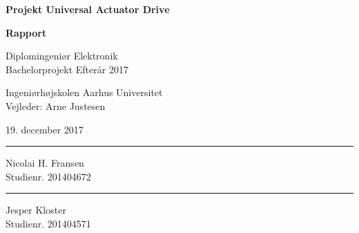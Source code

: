 \documentclass[11pt, a4paper, twoside, openany]{memoir}
\date{}
\author{\forfatter}
\title{\titel}
\begin{document}
\begin{titlingpage}
		
		\begin{center}
				{\huge\bfseries Projekt Universal Actuator Drive}\\
				\vspace{10pt}
				
				{\Huge\bfseries Rapport}\\
				
				\vspace{20pt}
				
				{Diplomingeniør Elektronik}\\
				{\large Bachelorprojekt Efterår 2017}\\
				
				\vspace{10pt}
				
				Ingeniørhøjskolen Aarhus Universitet\\
				Vejleder: Arne Justesen
				\vspace{10pt}
				
				19. december 2017
				\vspace{10pt}
				\begin{figure}[H]
					\centering
				\end{figure}
				\vspace{50pt}
				\begin{minipage}{0.25\linewidth}
					\centering
					\hrule
					\vspace{12pt}
					Nicolai H. Fransen\\
					Studienr. 201404672
				\end{minipage}
				\hspace{10pt}
				\begin{minipage}{0.25\linewidth}
					\centering
					\hrule
					\vspace{12pt}
					Jesper Kloster\\
					Studienr. 201404571
				\end{minipage}
				\hspace{10pt}


		\end{center}

\end{titlingpage}
		
\end{document}
